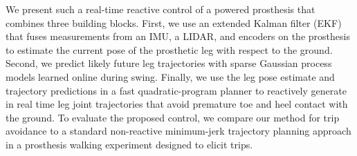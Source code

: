We present such a real-time reactive control of a powered prosthesis that
combines three building blocks. First, we use an extended Kalman filter (EKF)
that fuses measurements from an IMU, a LIDAR, and encoders on the prosthesis to
estimate the current pose of the prosthetic leg with respect to the ground.
Second, we predict likely future leg trajectories with sparse Gaussian process
models learned online during swing. Finally, we use the leg pose estimate and
trajectory predictions in a fast quadratic-program planner to reactively
generate in real time leg joint trajectories that avoid premature toe and heel
contact with the ground. To evaluate the proposed control, we compare our method
for trip avoidance to a standard non-reactive minimum-jerk trajectory planning
approach in a prosthesis walking experiment designed to elicit trips.
